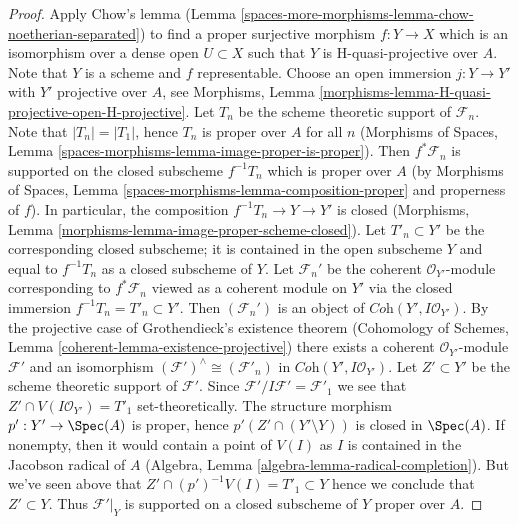 \begin{proof}
\medskip\noindent
Apply Chow's lemma (Lemma \ref{spaces-more-morphisms-lemma-chow-noetherian-separated})
to find a proper surjective morphism $f : Y \to X$ which is an isomorphism
over a dense open $U \subset X$ such that $Y$ is H-quasi-projective
over $A$. Note that $Y$ is a scheme and $f$ representable.
Choose an open immersion $j : Y \to Y'$ with $Y'$ projective over $A$, see
Morphisms, Lemma \ref{morphisms-lemma-H-quasi-projective-open-H-projective}.
Let $T_n$ be the scheme theoretic support of $\mathcal{F}_n$.
Note that $|T_n| = |T_1|$, hence $T_n$ is proper over $A$ for all $n$
(Morphisms of Spaces, Lemma
\ref{spaces-morphisms-lemma-image-proper-is-proper}).
Then $f^*\mathcal{F}_n$ is supported on the closed subscheme
$f^{-1}T_n$ which is proper over $A$ (by
Morphisms of Spaces, Lemma \ref{spaces-morphisms-lemma-composition-proper}
and properness of $f$).
In particular, the composition $f^{-1}T_n \to Y \to Y'$ is closed
(Morphisms, Lemma \ref{morphisms-lemma-image-proper-scheme-closed}).
Let $T'_n \subset Y'$ be the corresponding closed subscheme;
it is contained in the open subscheme $Y$ and equal to $f^{-1}T_n$
as a closed subscheme of $Y$. Let $\mathcal{F}_n'$
be the coherent $\mathcal{O}_{Y'}$-module corresponding to
$f^*\mathcal{F}_n$ viewed as a coherent module on $Y'$ via
the closed immersion $f^{-1}T_n = T'_n \subset Y'$.
Then $(\mathcal{F}_n')$
is an object of $\textit{Coh}(Y', I\mathcal{O}_{Y'})$.
By the projective case of Grothendieck's existence theorem
(Cohomology of Schemes, Lemma \ref{coherent-lemma-existence-projective})
there exists a coherent $\mathcal{O}_{Y'}$-module
$\mathcal{F}'$ and an isomorphism
$(\mathcal{F}')^\wedge \cong (\mathcal{F}'_n)$ in
$\textit{Coh}(Y', I\mathcal{O}_{Y'})$.
Let $Z' \subset Y'$ be the scheme theoretic support of $\mathcal{F}'$.
Since $\mathcal{F}'/I\mathcal{F}' = \mathcal{F}'_1$ we see
that $Z' \cap V(I\mathcal{O}_{Y'}) = T'_1$ set-theoretically.
The structure morphism $p' : Y' \to \Spec(A)$ is proper, hence
$p'(Z' \cap (Y' \setminus Y))$ is closed in $\Spec(A)$.
If nonempty, then it would contain a point of $V(I)$
as $I$ is contained in the Jacobson radical of $A$
(Algebra, Lemma \ref{algebra-lemma-radical-completion}).
But we've seen above that $Z' \cap (p')^{-1}V(I) = T'_1 \subset Y$
hence we conclude that $Z' \subset Y$. Thus $\mathcal{F}'|_Y$
is supported on a closed subscheme of $Y$ proper over $A$.


\end{proof}
